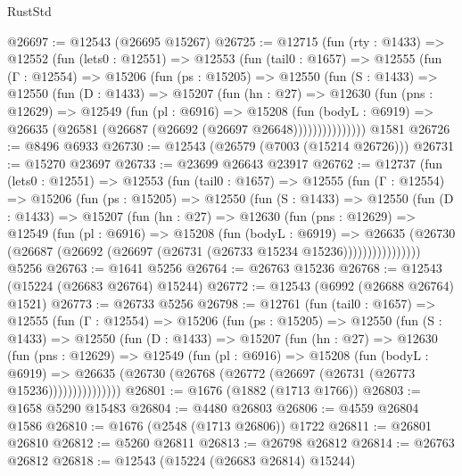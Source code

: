 \begin{lexlean}{RustStd}
\begin{coremodule}
@26697 := @12543 (@26695 @15267)
@26725 := @12715
    (fun (rty : @1433) =>
    @12552
      (fun (lets0 : @12551) =>
      @12553
        (fun (tail0 : @1657) =>
        @12555
          (fun (Γ : @12554) =>
          @15206
            (fun (ps : @15205) =>
            @12550
              (fun (S : @1433) =>
              @12550
                (fun (D : @1433) =>
                @15207
                  (fun (hn : @27) =>
                  @12630
                    (fun (pns : @12629) =>
                    @12549
                      (fun (pl : @6916) =>
                      @15208
                        (fun (bodyL : @6919) =>
                        @26635 (@26581 (@26687 (@26692 (@26697 @26648)))))))))))))))
    @1581
@26726 := @8496 @6933
@26730 := @12543 (@26579 (@7003 (@15214 @26726)))
@26731 := @15270 @23697
@26733 := @23699 @26643 @23917
@26762 := @12737
    (fun (lets0 : @12551) =>
    @12553
      (fun (tail0 : @1657) =>
      @12555
        (fun (Γ : @12554) =>
        @15206
          (fun (ps : @15205) =>
          @12550
            (fun (S : @1433) =>
            @12550
              (fun (D : @1433) =>
              @15207
                (fun (hn : @27) =>
                @12630
                  (fun (pns : @12629) =>
                  @12549
                    (fun (pl : @6916) =>
                    @15208
                      (fun (bodyL : @6919) =>
                      @26635
                        (@26730
                          (@26687 (@26692 (@26697 (@26731 (@26733 @15234 @15236))))))))))))))))
    @5256
@26763 := @1641 @5256
@26764 := @26763 @15236
@26768 := @12543 (@15224 (@26683 @26764) @15244)
@26772 := @12543 (@6992 (@26688 @26764) @1521)
@26773 := @26733 @5256
@26798 := @12761
    (fun (tail0 : @1657) =>
    @12555
      (fun (Γ : @12554) =>
      @15206
        (fun (ps : @15205) =>
        @12550
          (fun (S : @1433) =>
          @12550
            (fun (D : @1433) =>
            @15207
              (fun (hn : @27) =>
              @12630
                (fun (pns : @12629) =>
                @12549
                  (fun (pl : @6916) =>
                  @15208
                    (fun (bodyL : @6919) =>
                    @26635 (@26730 (@26768 (@26772 (@26697 (@26731 (@26773 @15236)))))))))))))))
@26801 := @1676 (@1882 (@1713 @1766))
@26803 := @1658 @5290 @15483
@26804 := @4480 @26803
@26806 := @4559 @26804 @1586
@26810 := @1676 (@2548 (@1713 @26806)) @1722
@26811 := @26801 @26810
@26812 := @5260 @26811
@26813 := @26798 @26812
@26814 := @26763 @26812
@26818 := @12543 (@15224 (@26683 @26814) @15244)

\end{coremodule}
\end{lexlean}
